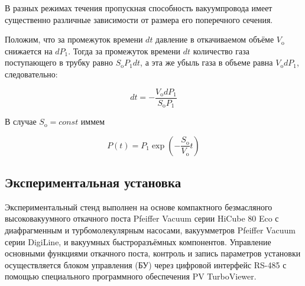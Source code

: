 \documentclass[12pt,a4paper]{article}
\begin{document}
В разных режимах течения пропускная способность вакуумпровода имеет существенно различные зависимости от размера его поперечного сечения.

Положим, что за промежуток времени $dt$ давление
в откачиваемом объёме $V_{\text{o}}$ снижается на $dP_1$. Тогда за промежуток времени $dt$ количество газа поступающего в трубку равно $S_{\text{o}} P_1 dt$, а эта же
убыль газа в объеме равна $V_{\text{o}} dP_1$, следовательно:

\begin{equation}
	dt = - \frac{V_{\text{o}} dP_1}{S_{\text{o}}P_1}
\end{equation}

В случае $S_{\text{o}} = const$ иммем 

\begin{equation}
	P(t) = P_1 \exp \left( - \frac{S_{\text{o}}}{V_{\text{o}}}t \right)
\end{equation}


\subsection*{Экспериментальная установка}

Экспериментальный стенд выполнен на основе компактного безмасляного высоковакуумного откачного поста Pfeiffer Vacuum серии HiCube 80 Eco с диафрагменным и турбомолекулярным насосами, вакуумметров Pfeiffer Vacuum серии DigiLine, и вакуумных быстроразъёмных компонентов. Управление основными функциями откачного
поста, контроль и запись параметров установки осуществляется блоком управления (БУ) через цифровой интерфейс RS-485 с помощью специального программного обеспечения PV TurboViewer.
\end{document}
